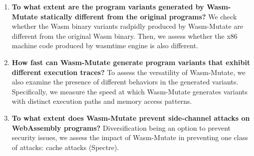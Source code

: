 \documentclass[sigplan,screen]{acmart}
\newcommand{\tool}{{\sc Wasm-Mutate}\xspace}
\newcommand{\wasm}{Wasm\xspace}
\newcommand{\Wasm}{WebAssembly\xspace}
\begin{document}

\newcommand\rqstatic{To what extent are the program variants generated by \tool statically different from the original programs?\xspace}

\newcommand\rqdynamic{How fast can \tool generate program variants that exhibit different execution traces?\xspace}

\newcommand\rqdefensive{To what extent does \tool prevent side-channel attacks on \Wasm programs?\xspace}


\newcommand\rqperformance{To what extent does \tool affects the performance of \Wasm program variants?\xspace}


\newcommand\rqtesting{To what extent can \tool be used to perform differential testing of \Wasm tools?\xspace}

\newcommand{\nProgramsRosetta}{303\xspace}


\newcommand{\DTWStatic}{\ensuremath{\mathit{dt\_static}\xspace}}
\newcommand{\DTWDynamic}{\ensuremath{\mathit{dt\_dy}\xspace}}

\begin{enumerate}[label=RQ\arabic*:, ref=RQ\arabic*]
     \item \label{rq:static} \textbf{\rqstatic}
        We  check whether the \wasm binary variants radpidly produced by \tool are different from the original \wasm binary. Then, we assess whether the x86 machine code produced by wasmtime engine is also different.
    
    \item \label{rq:dynamic}\textbf{\rqdynamic}
    To assess the versatility of \tool, we also examine the presence of different behaviors in the generated variants. 
    Specifically, we measure the speed at which \tool generates variants with distinct execution paths and memory access patterns.
    
        
    \item \label{rq:defensive}\textbf{\rqdefensive} 
     \label{rq:performance} Diversification being an option to prevent security issues,  we assess the impact of \tool in preventing one class of attacks: cache attacks (Spectre).
        
\end{enumerate}
\end{document}
